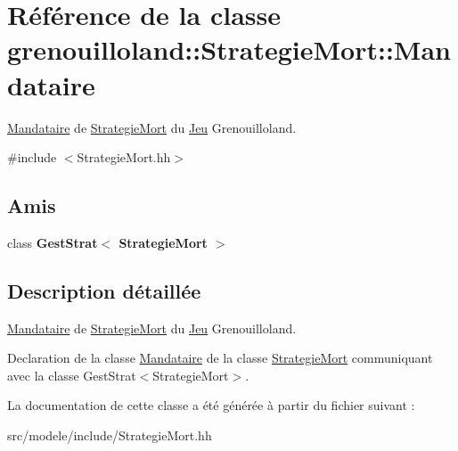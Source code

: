 \hypertarget{classgrenouilloland_1_1StrategieMort_1_1Mandataire}{\section{Référence de la classe grenouilloland\-:\-:Strategie\-Mort\-:\-:Mandataire}
\label{classgrenouilloland_1_1StrategieMort_1_1Mandataire}
}


\hyperlink{classgrenouilloland_1_1StrategieMort_1_1Mandataire}{Mandataire} de \hyperlink{classgrenouilloland_1_1StrategieMort}{Strategie\-Mort} du \hyperlink{classgrenouilloland_1_1Jeu}{Jeu} Grenouilloland.  




{\ttfamily \#include $<$Strategie\-Mort.\-hh$>$}

\subsection*{Amis}
\begin{DoxyCompactItemize}
\item 
\hypertarget{classgrenouilloland_1_1StrategieMort_1_1Mandataire_a7e91577d33b13df6e4b27de93184f04a}{class {\bfseries Gest\-Strat$<$ Strategie\-Mort $>$}}\label{classgrenouilloland_1_1StrategieMort_1_1Mandataire_a7e91577d33b13df6e4b27de93184f04a}

\end{DoxyCompactItemize}


\subsection{Description détaillée}
\hyperlink{classgrenouilloland_1_1StrategieMort_1_1Mandataire}{Mandataire} de \hyperlink{classgrenouilloland_1_1StrategieMort}{Strategie\-Mort} du \hyperlink{classgrenouilloland_1_1Jeu}{Jeu} Grenouilloland. 

Declaration de la classe \hyperlink{classgrenouilloland_1_1StrategieMort_1_1Mandataire}{Mandataire} de la classe \hyperlink{classgrenouilloland_1_1StrategieMort}{Strategie\-Mort} communiquant avec la classe Gest\-Strat$<$\-Strategie\-Mort$>$. 

La documentation de cette classe a été générée à partir du fichier suivant \-:\begin{DoxyCompactItemize}
\item 
src/modele/include/Strategie\-Mort.\-hh\end{DoxyCompactItemize}
